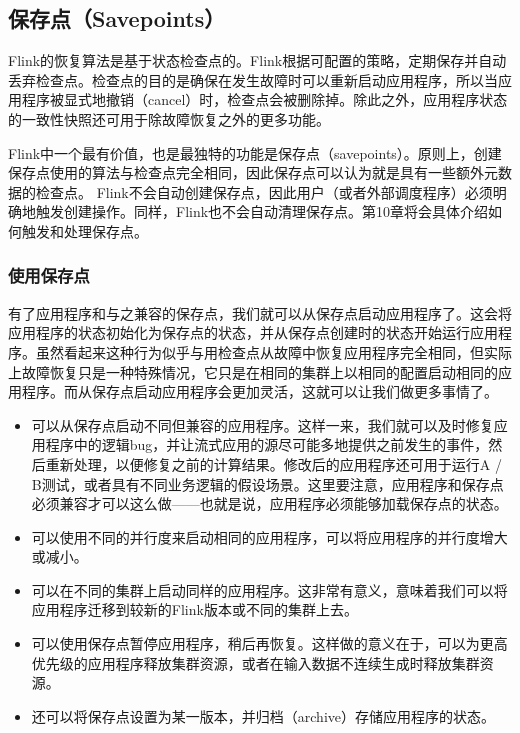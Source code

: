 \documentclass[oneside]{ctexbook}
\begin{document}
\subsection{保存点（Savepoints）}

Flink的恢复算法是基于状态检查点的。Flink根据可配置的策略，定期保存并自动丢弃检查点。检查点的目的是确保在发生故障时可以重新启动应用程序，所以当应用程序被显式地撤销（cancel）时，检查点会被删除掉。除此之外，应用程序状态的一致性快照还可用于除故障恢复之外的更多功能。

Flink中一个最有价值，也是最独特的功能是保存点（savepoints）。原则上，创建保存点使用的算法与检查点完全相同，因此保存点可以认为就是具有一些额外元数据的检查点。 Flink不会自动创建保存点，因此用户（或者外部调度程序）必须明确地触发创建操作。同样，Flink也不会自动清理保存点。第10章将会具体介绍如何触发和处理保存点。

\subsubsection{使用保存点}

有了应用程序和与之兼容的保存点，我们就可以从保存点启动应用程序了。这会将应用程序的状态初始化为保存点的状态，并从保存点创建时的状态开始运行应用程序。虽然看起来这种行为似乎与用检查点从故障中恢复应用程序完全相同，但实际上故障恢复只是一种特殊情况，它只是在相同的集群上以相同的配置启动相同的应用程序。而从保存点启动应用程序会更加灵活，这就可以让我们做更多事情了。

\begin{itemize}
  \item 可以从保存点启动不同但兼容的应用程序。这样一来，我们就可以及时修复应用程序中的逻辑bug，并让流式应用的源尽可能多地提供之前发生的事件，然后重新处理，以便修复之前的计算结果。修改后的应用程序还可用于运行A / B测试，或者具有不同业务逻辑的假设场景。这里要注意，应用程序和保存点必须兼容才可以这么做——也就是说，应用程序必须能够加载保存点的状态。
  \item 可以使用不同的并行度来启动相同的应用程序，可以将应用程序的并行度增大或减小。
  \item 可以在不同的集群上启动同样的应用程序。这非常有意义，意味着我们可以将应用程序迁移到较新的Flink版本或不同的集群上去。
  \item 可以使用保存点暂停应用程序，稍后再恢复。这样做的意义在于，可以为更高优先级的应用程序释放集群资源，或者在输入数据不连续生成时释放集群资源。
  \item 还可以将保存点设置为某一版本，并归档（archive）存储应用程序的状态。
\end{itemize}
\end{document}
